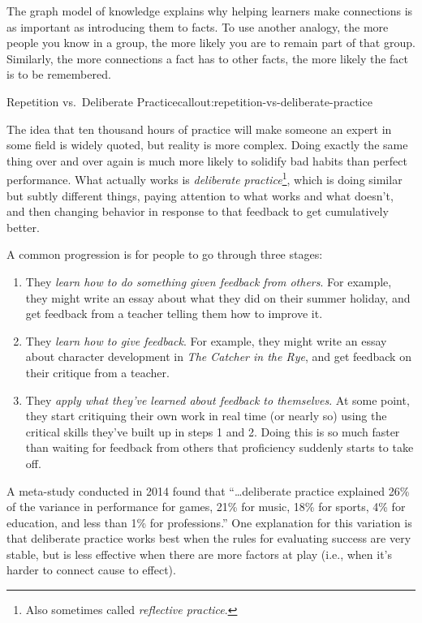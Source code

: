 The graph model of knowledge explains why helping learners make
connections is as important as introducing them to facts.  To use
another analogy, the more people you know in a group, the more likely
you are to remain part of that group.  Similarly, the more connections
a fact has to other facts, the more likely the fact is to be
remembered.

\begin{callout}{Repetition vs.\ Deliberate Practice}{callout:repetition-vs-deliberate-practice}

The idea that ten thousand hours of practice will make someone an
expert in some field is widely quoted, but reality is more complex.
Doing exactly the same thing over and over again is much more likely
to solidify bad habits than perfect performance.  What actually works
is \emph{deliberate practice}\footnote{Also sometimes called
\emph{reflective practice}.}, which is doing similar but subtly
different things, paying attention to what works and what doesn't, and
then changing behavior in response to that feedback to get
cumulatively better.

A common progression is for people to go through three stages:

\begin{enumerate}

\item
  They \emph{learn how to do something given feedback from others}.
  For example, they might write an essay about what they did on their
  summer holiday, and get feedback from a teacher telling them how to
  improve it.

\item
  They \emph{learn how to give feedback}.  For example, they might
  write an essay about character development in \emph{The Catcher in
  the Rye}, and get feedback on their critique from a teacher.

\item
  They \emph{apply what they've learned about feedback to themselves}.
  At some point, they start critiquing their own work in real time (or
  nearly so) using the critical skills they've built up in steps 1 and
  2.  Doing this is so much faster than waiting for feedback from
  others that proficiency suddenly starts to take off.

\end{enumerate}

A meta-study conducted in 2014 \cite{bib:macnamara-deliberate} found
that ``{\ldots}deliberate practice explained 26\% of the variance in
performance for games, 21\% for music, 18\% for sports, 4\% for
education, and less than 1\% for professions.'' One explanation for
this variation is that deliberate practice works best when the rules
for evaluating success are very stable, but is less effective when
there are more factors at play (i.e., when it's harder to connect
cause to effect).

\end{callout}

